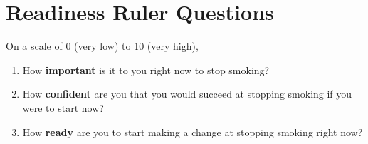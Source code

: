 \chapter{Readiness Ruler Questions}
\begin{tcolorbox}[floatplacement=pthb!,
		fonttitle=\bfseries,
		fontupper=\small]

	\label{appendix:readiness_rulers}

	On a scale of 0 (very low) to 10 (very high),
	\begin{enumerate}[itemsep=0pt]
		\item How \textbf{important} is it to you right now to stop smoking?
		\item How \textbf{confident} are you that you would succeed at stopping smoking if you were to start now?
		\item How \textbf{ready} are you to start making a change at stopping smoking right now?
	\end{enumerate}

\end{tcolorbox}